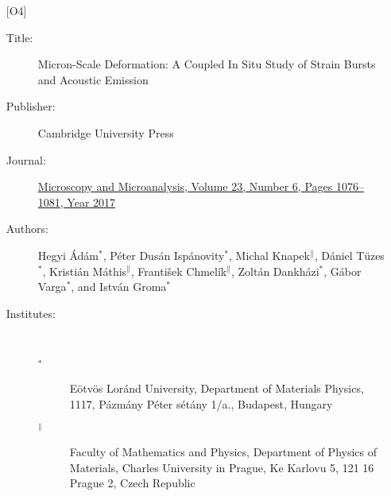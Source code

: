 \begin{itemize}
\item [{[O4]}] \label{paper:A1}
\begin{description}
\item [Title:] Micron-Scale Deformation: A Coupled In Situ Study of Strain Bursts and Acoustic Emission
\item [Publisher:] Cambridge University Press
\item [Journal:] \href{https://doi.org/10.1017/S1431927617012594}{Microscopy and Microanalysis, Volume 23, Number 6, Pages 1076--1081, Year 2017}
\item [Authors:] Hegyi Ádám$^*$, Péter Dusán Ispánovity$^*$, Michal Knapek$^\|$, Dániel Tüzes$^*$, Kristián Máthis$^\|$, František Chmelík$^\|$, Zoltán Dankházi$^*$, Gábor Varga$^*$, and István Groma$^*$
\item [Institutes:]~
\begin{description}
\item [$^*$] Eötvös Loránd University, Department of Materials Physics, 1117, Pázmány Péter sétány 1/a., Budapest, Hungary
\item [$^\|$] Faculty of Mathematics and Physics, Department of Physics of Materials, Charles University in Prague, Ke Karlovu 5, 121 16 Prague 2, Czech Republic
\end{description}
\end{description}
\end{itemize}



